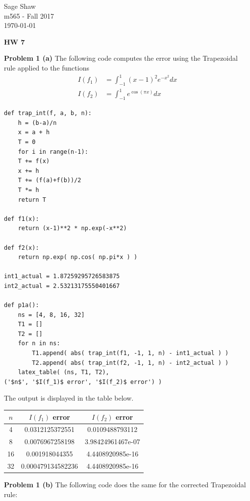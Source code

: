 \documentclass[12pt]{article}
\newcommand{\problem}[1]{\hspace{-4 ex} \large \textbf{Problem #1} }
\begin{document}
	\thispagestyle{empty}
	
	\begin{flushright}
		Sage Shaw \\
		m565 - Fall 2017 \\
		\today
	\end{flushright}
	
{\large \textbf{HW 7}}\bigbreak

\problem{1 (a)} The following code computes the error using the Trapezoidal rule applied to the functions
\begin{align*}
	I(f_1) & = \int_{-1}^1 (x-1)^2e^{-x^2}dx \\
	I(f_2) & = \int_{-1}^1 e^{\cos(\pi x)} dx
\end{align*}

\begin{lstlisting}
def trap_int(f, a, b, n):
	h = (b-a)/n
	x = a + h
	T = 0
	for i in range(n-1):
	T += f(x)
	x += h
	T += (f(a)+f(b))/2
	T *= h
	return T

def f1(x):
	return (x-1)**2 * np.exp(-x**2)

def f2(x):
	return np.exp( np.cos( np.pi*x ) )

int1_actual = 1.87259295726583875
int2_actual = 2.53213175550401667

def p1a():
	ns = [4, 8, 16, 32]
	T1 = []
	T2 = []
	for n in ns:
		T1.append( abs( trap_int(f1, -1, 1, n) - int1_actual ) )
		T2.append( abs( trap_int(f2, -1, 1, n) - int2_actual ) )
	latex_table( (ns, T1, T2), 
('$n$', '$I(f_1)$ error', '$I(f_2)$ error') )
\end{lstlisting}

	The output is displayed in the table below.
	\begin{center}
		\begin{tabular}{|c|c|c|}
			\hline
			$n$&$I(f_1)$ error&$I(f_2)$ error\\ \hline
			4&0.0312125372551&0.0109488793112\\ \hline
			8&0.0076967258198&3.98424961467e-07\\ \hline
			16&0.001918044355&4.4408920985e-16\\ \hline
			32&0.000479134582236&4.4408920985e-16\\ \hline
		\end{tabular}
	\end{center}

\bigbreak
\problem{1 (b)} The following code does the same for the corrected Trapezoidal rule:
\end{document}
